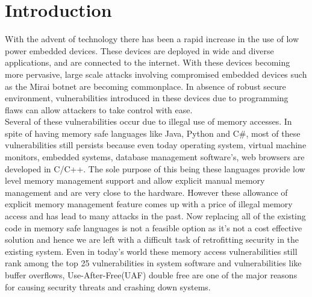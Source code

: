 
\section{Introduction}

With the advent of technology there has been a rapid increase in the use of low power embedded devices. These devices are deployed in wide and diverse applications, and are connected to the internet. With these devices becoming more pervasive, large scale attacks involving compromised embedded devices such as the Mirai botnet are becoming commonplace. In absence of robust secure environment, vulnerabilities introduced in these devices due to programming flaws can allow attackers to take control with ease.\\

Several of these vulnerabilities occur due to illegal use of memory accesses. In spite of having memory safe languages like Java, Python and C\#, most of these vulnerabilities still persists because even today operating system, virtual machine monitors, embedded systems, database management software's, web browsers are developed in C/C++. The sole purpose of this being these languages provide low level memory management support and allow explicit manual memory management and are very close to the hardware. However these allowance of explicit memory management feature comes up with a price of illegal memory access and has lead to many attacks in the past. Now replacing all of the existing code in memory safe languages is not a feasible option as it's not a cost effective solution and hence we are left with a difficult task of retrofitting security in the existing system. Even in today's world these memory access vulnerabilities still rank among the top 25 vulnerabilities in system software\cite{Top25} and vulnerabilities like buffer overflows\cite{Aleph}, Use-After-Free(UAF)\cite{NIST,DataAttacks,BeyondStackSmashing} double free are one of the major reasons for causing security threats and crashing down systems.\\

